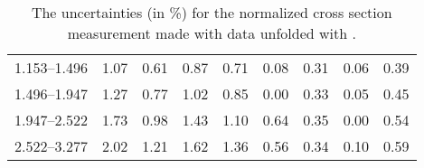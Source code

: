 \begin{table}
\begin{center}
\begin{tabular}{@{}l l l l l l l l l@{}}
            1.153--1.496    &  1.07   &  0.61   &  0.87         &  0.71      &  0.08    &  0.31  &  0.06       &  0.39  \\
            1.496--1.947    &  1.27   &  0.77   &  1.02         &  0.85      &  0.00    &  0.33  &  0.05       &  0.45  \\
            1.947--2.522    &  1.73   &  0.98   &  1.43         &  1.10      &  0.64    &  0.35  &  0.00       &  0.54  \\
            2.522--3.277    &  2.02   &  1.21   &  1.62         &  1.36      &  0.56    &  0.34  &  0.10       &  0.59  \\
            \bottomrule
        \end{tabular}
    \end{center}
    \caption[
        The uncertainties for the normalized cross section measurement made
        with data unfolded with \MADGRAPH.
    ]{
        The uncertainties (in \%) for the normalized cross section measurement
        made with data unfolded with \MADGRAPH.
    }
    \label{tab:sys_uncert_norm}
\end{table}
